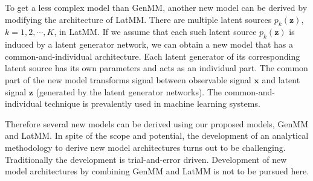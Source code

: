 To get a less complex model than GenMM, another new model can be derived by modifying the architecture of LatMM. There are multiple latent sources $p_k(\bm{z})$, $k=1, 2, \cdots, K$, in LatMM. If we assume that each such latent source $p_k(\bm{z})$ is induced by a latent generator network, we can obtain a new model that has a common-and-individual architecture. Each latent generator of its corresponding latent source has its own parameters and acts as an individual part. The common part of the new model transforms signal between observable signal $\bm{x}$ and latent signal $\bm{z}$ (generated by the latent generator networks). The common-and-individual technique is prevalently used in machine learning systems\cite{sundman2016design, SUNDMAN2014298}.

Therefore several new models can be derived using our proposed models, GenMM and LatMM. In spite of the scope and potential, the development of an analytical methodology to derive new model architectures turns out to be challenging. Traditionally the development is trial-and-error driven. Development of new model architectures by combining GenMM and LatMM is not to be pursued here.   


